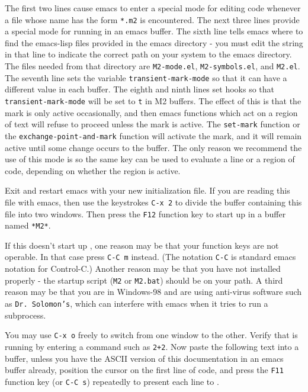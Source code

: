 The first two lines cause emacs to enter a special mode for editing \Mtwo
code whenever a file whose name has the form {\tt {}*.m2} is encountered.  
The next three lines provide a special mode for running \Mtwo in an emacs buffer.
The sixth line tells emacs where to find the emacs-lisp files provided in the
\Mtwo emacs directory - you must edit the string in that line to
indicate the correct path on your system to the \Mtwo emacs directory.
The files needed from that directory are {\tt {}M2-mode.el},
{\tt {}M2-symbols.el}, and {\tt {}M2.el}.  The seventh line sets
the variable {\tt {}transient-mark-mode} so that it can
have a different value in each buffer.  The eighth and ninth lines set
hooks so that {\tt {}transient-mark-mode} will be set to {\tt {}t} 
in M2 buffers.  The effect of this is that the mark is only active occasionally,
and then emacs functions which act on a region of text will refuse to proceed 
unless the mark is active.  The {\tt {}set-mark} function or the
{\tt {}exchange-point-and-mark} function will activate the mark, and it
will remain active until some change occurs to the buffer.  The only reason
we recommend the use of this mode is so the same key can be used to evaluate 
a line or a region of code, depending on whether the region is active.

Exit and restart emacs with your new initialization file.  
If you are reading this file with emacs, then use the keystrokes
{\tt {}C-x\ 2} to divide the buffer containing this file into two windows.
Then press the {\tt {}F12} function key to start up 
\Mtwo in a buffer named {\tt {}*M2*}.

If this doesn't start up \Mtwo, one reason may be that your function
keys are not operable.  In that case press {\tt {}C-C\ m} instead.  (The 
notation {\tt {}C-C} is standard emacs notation for Control-C.)  Another
reason may be that you have not installed \Mtwo properly - the startup
script ({\tt {}M2} or {\tt {}M2.bat}) should be on your path.
A third reason may be that you are in Windows-98 and are using anti-virus 
software such as {\tt {}Dr.\ Solomon's}, which can interfere with emacs 
when it tries to run a subprocess.

You may use {\tt {}C-x\ o} freely to switch from one window to the other.
Verify that \Mtwo is running by entering a command such as {\tt {}2+2}.  
Now paste the following text into a buffer, unless you have the ASCII
version of this documentation in an emacs buffer already, position
the cursor on the first line of code, and press the {\tt {}F11} function 
key (or {\tt {}C-C\ s}) repeatedly to present each line to \Mtwo.

